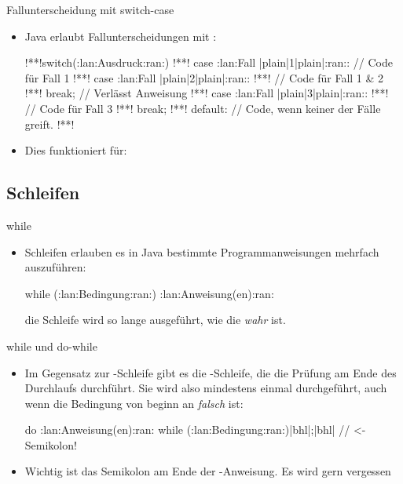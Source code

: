 \begin{frame}[fragile]{Fallunterscheidung mit switch-case}
    \begin{itemize}[<+(1)->]
        \item Java erlaubt Fallunterscheidungen mit :\pause{}
\begin{plainjava}
!**!switch(:lan:Ausdruck:ran:){
!**!    case :lan:Fall |plain|1|plain|:ran:: // Code für Fall 1
!**!    case :lan:Fall |plain|2|plain|:ran::
!**!        // Code für Fall 1 & 2
!**!        break; // Verlässt Anweisung
!**!    case :lan:Fall |plain|3|plain|:ran::
!**!        // Code für Fall 3
!**!        break;
!**!    default: // Code, wenn keiner der Fälle greift.
!**!}
\end{plainjava}
    \item<10-> Dies funktioniert für: 
    \end{itemize}
\end{frame}

\subsection{Schleifen}

\begin{frame}[fragile]{while}
    \begin{itemize}[<+(1)->]
        \item Schleifen erlauben es in Java bestimmte Programmanweisungen mehrfach auszuführen:\pause{}
        \begin{plainjava}
while (:lan:Bedingung:ran:) {
    :lan:Anweisung(en):ran:
}
        \end{plainjava}
        \pause{} die Schleife wird so lange ausgeführt, wie die  \emph{wahr} ist.
    \end{itemize}
\end{frame}

\begin{frame}[fragile]{while und do-while}
    \begin{itemize}[<+(1)->]
        \item Im Gegensatz zur -Schleife gibt es die -Schleife,\pause{} die die Prüfung am Ende des Durchlaufs durchführt.\pause{} Sie wird also mindestens einmal durchgeführt,\pause{} auch wenn die Bedingung von beginn an \emph{falsch} ist:
        \begin{plainjava}
do {
    :lan:Anweisung(en):ran:
} while (:lan:Bedingung:ran:)|bhl|;|bhl| // <- Semikolon!
        \end{plainjava}
        \item Wichtig ist das Semikolon am Ende der -Anweisung. Es wird gern vergessen
    \end{itemize}
\end{frame}

